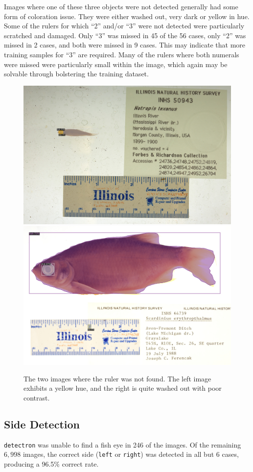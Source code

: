 \documentclass[conference]{IEEEtran}
\begin{document}
Images where one of these three objects were not detected generally had some form of coloration issue. They were either washed out, very dark or yellow in hue. Some of the rulers for which ``2'' and/or ``3'' were not detected were particularly scratched and damaged. Only ``3'' was missed in 45 of the 56 cases, only ``2'' was missed in 2 cases, and both were missed in 9 cases. This may indicate that more training samples for ``3'' are required. Many of the rulers where both numerals were missed were particularly small within the image, which again may be solvable through bolstering the training dataset.

\begin{figure}[H]
  \centering
  \includegraphics[width=0.49\linewidth]{images/no_ruler1}
  \includegraphics[width=0.49\linewidth]{images/no_ruler2}
  \caption{The two images where the ruler was not found. The left image exhibits a yellow hue, and the right is quite washed out with poor contrast.}
\end{figure}


\subsection{Side Detection}
\verb|detectron| was unable to find a fish eye
in 246 of the images. Of the remaining \(6,998\) images, the correct side
(\verb|left| or \verb|right|) was detected in all but 6 cases, producing
a 96.5\% correct rate.
\end{document}
